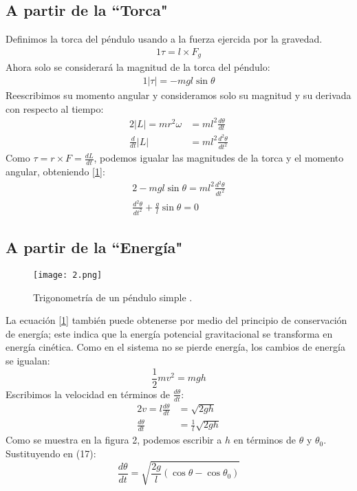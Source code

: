 \documentclass[12pt]{article}
\begin{document}
\subsection{A partir de la ``Torca"}
Definimos la torca del péndulo usando a la fuerza ejercida por la gravedad.
\begin{alignat}{1}
\tau = l \times F_g
\end{alignat}
Ahora solo se considerará la magnitud de la torca del péndulo:
\begin{alignat}{1}
|\tau|=-mgl\sin\theta
\end{alignat}
Reescribimos su momento angular y consideramos solo su magnitud y su derivada con respecto al tiempo:
\begin{alignat}{2}
|L|=mr^2\omega&=ml^2\frac{d\theta}{dt}\\
\frac{d}{dt}|L|&=ml^2\frac{d^2\theta}{dt^2}
\end{alignat}
Como $\displaystyle \tau=r\times F=\frac{dL}{dt}$, podemos igualar las magnitudes de la torca y el momento angular, obteniendo \eqref{1}:
\begin{alignat}{2}
-mgl\sin\theta=ml^2\frac{d^2\theta}{dt^2} \\
\frac{d^2\theta}{dt^2} + \frac{g}{l}\sin\theta=0 
\end{alignat}

\subsection{A partir de la ``Energía"}
\begin{figure}[H]
\centering
\texttt{[image: 2.png]}
\caption{Trigonometría de un péndulo simple \cite{2}.}
\end{figure}
La ecuación \eqref{1} también puede obtenerse por medio del principio de conservación de energía; este indica que la energía potencial gravitacional se transforma en energía cinética. Como en el sistema no se pierde energía, los cambios de energía se igualan:
\begin{equation}
\frac{1}{2}mv^2=mgh
\end{equation}
Escribimos la velocidad en términos de $\displaystyle\frac{d\theta}{dt}$:
\begin{alignat}{2}
v=l\frac{d\theta}{dt}&=\sqrt{2gh} \\
\frac{d\theta}{dt}&=\frac{1}{l}\sqrt{2gh}
\end{alignat}
Como se muestra en la figura 2, podemos escribir a $h$ en términos de $\theta$ y $\theta_0$. Sustituyendo en (17):
\begin{equation}
\label{2}
\frac{d\theta}{dt}=\sqrt{\frac{2g}{l}(\cos\theta-\cos\theta_0)}
\end{equation}
\end{document}
